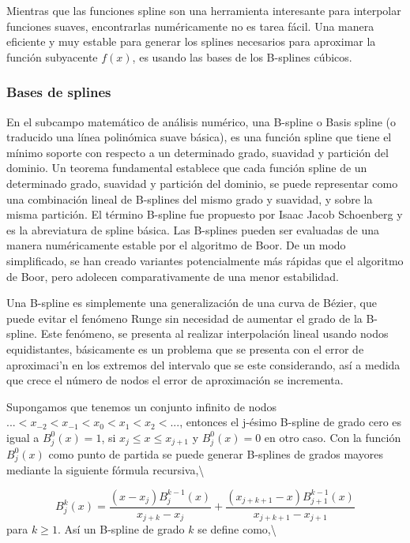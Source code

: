 \documentclass[
  12pt,
]{krantz}
\begin{document}
Mientras que las funciones spline son una herramienta interesante para interpolar funciones suaves, encontrarlas numéricamente no es tarea fácil. Una manera eficiente y muy estable para generar los splines necesarios para aproximar la función subyacente \(f(x)\), es usando las bases de los B-splines cúbicos.

\hypertarget{bases-de-splines}{%
\subsubsection{Bases de splines}\label{bases-de-splines}}

En el subcampo matemático de análisis numérico, una B-spline o Basis spline (o traducido una línea polinómica suave básica), es una función spline que tiene el mínimo soporte con respecto a un determinado grado, suavidad y partición del dominio. Un teorema fundamental establece que cada función spline de un determinado grado, suavidad y partición del dominio, se puede representar como una combinación lineal de B-splines del mismo grado y suavidad, y sobre la misma partición. El término B-spline fue propuesto por Isaac Jacob Schoenberg y es la abreviatura de spline básica. Las B-splines pueden ser evaluadas de una manera numéricamente estable por el algoritmo de Boor. De un modo simplificado, se han creado variantes potencialmente más rápidas que el algoritmo de Boor, pero adolecen comparativamente de una menor estabilidad.

Una B-spline es simplemente una generalización de una curva de Bézier, que puede evitar el fenómeno Runge sin necesidad de aumentar el grado de la B-spline. Este fenómeno, se presenta al realizar interpolación lineal usando nodos equidistantes, básicamente es un problema que se presenta con el error de aproximaci'n en los extremos del intervalo que se este considerando, así a medida que crece el número de nodos el error de aproximación se incrementa.

Supongamos que tenemos un conjunto infinito de nodos \(...<x_{-2}<x_{-1}<x_{0}<x_{1}<x_{2}<...\), entonces el j-ésimo B-spline de grado cero es igual a \(B^{0}_{j}(x)=1\), si \(x_{j} \leq x \leq x_{j+1}\) y \(B^{0}_{j}(x)=0\) en otro caso. Con la función \(B^{0}_{j}(x)\) como punto de partida se puede generar B-splines de grados mayores mediante la siguiente fórmula recursiva,\textbackslash{}

\[\displaystyle{B^{k}_{j}(x) = \frac{(x-x_{j})B^{k-1}_{j}(x)}{x_{j+k}-x_{j}} + \frac{(x_{j+k+1}-x)B^{k-1}_{j+1}(x)}{x_{j+k+1}-x_{j+1}}}\]
para \(k\geq 1\). Así un B-spline de grado \(k\) se define como,\textbackslash{}
\end{document}
